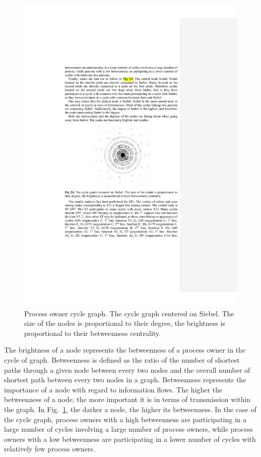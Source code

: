 \documentclass[lnbip]{svmultln}
\begin{document}
\begin{figure}
  \begin{center}
    \includegraphics[width=.7\textwidth]{"figs/pic 26"}
  \end{center}
  \caption{Process owner cycle graph. The cycle graph centered on Siebel. The size of the nodes is proportional to their degree, the brightness is proportional to their betweenness centrality.}
  \label{fig:cycleGraphSiebel}
\end{figure}

The brightness of a node represents the betweenness of a process owner in the cycle of graph. Betweenness is defined as the ratio of the number of shortest paths through a given node between every two nodes and the overall number of shortest path between every two nodes in a graph. Betweenness represents the importance of a node with regard to information flows. The higher the betweenness of a node, the more important it is in terms of transmission within the graph. In Fig.~\ref{fig:cycleGraphSiebel}, the darker a node, the higher its betweenness. In the case of the cycle graph, process owners with a high betweenness are participating in a large number of cycles involving a large number of process owners, while process owners with a low betweenness are participating in a lower number of cycles with relatively few process owners.
\end{document}
